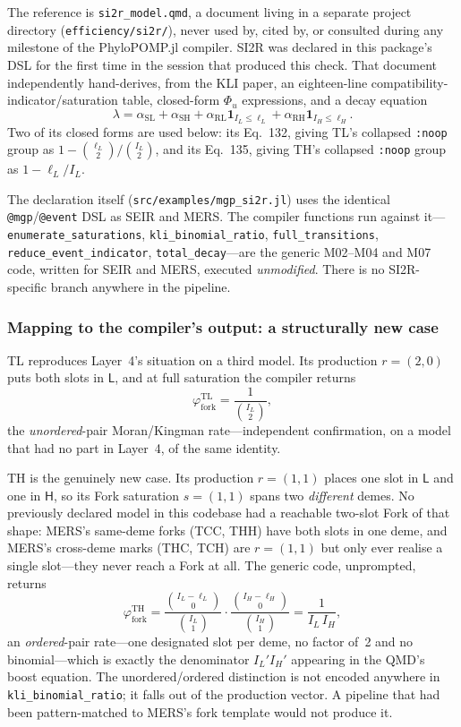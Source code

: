 \documentclass[11pt,leqno]{article}
\newcommand{\indicator}[1]{\mathbf{1}_{#1}}
\newcommand{\pkg}[1]{\textsf{#1}}
\newcommand{\code}[1]{\texttt{#1}}
\newcommand{\deme}[1]{\mathsf{#1}}
\theoremstyle{plain}
\theoremstyle{definition}
\begin{document}
The reference is \code{si2r\_model.qmd}, a document living in a separate
project directory (\code{efficiency/si2r/}), never used by, cited by, or
consulted during any milestone of the \pkg{PhyloPOMP.jl} compiler.  SI2R was
declared in this package's DSL for the first time in the session that
produced this check.  That document independently hand-derives, from the KLI
paper, an eighteen-line compatibility-indicator/saturation table, closed-form
$\Phi_u$ expressions, and a decay equation
\[
  \lambda = \alpha_{\text{SL}} + \alpha_{\text{SH}}
    + \alpha_{\text{RL}} \indicator{I_L \le \ell_L}
    + \alpha_{\text{RH}} \indicator{I_H \le \ell_H}.
\]
Two of its closed forms are used below: its Eq.~132, giving TL's collapsed
\code{:noop} group as $1 - \binom{\ell_L}{2}\big/\binom{I_L}{2}$, and its
Eq.~135, giving TH's collapsed \code{:noop} group as $1 - \ell_L/I_L$.

The declaration itself (\code{src/examples/mgp\_si2r.jl}) uses the identical
\code{@mgp}/\code{@event} DSL as SEIR and MERS.  The compiler functions run
against it---\code{enumerate\_saturations}, \code{kli\_binomial\_ratio},
\code{full\_transitions}, \code{reduce\_event\_indicator},
\code{total\_decay}---are the generic M02--M04 and M07 code, written for
SEIR and MERS, executed \emph{unmodified}.  There is no SI2R-specific branch
anywhere in the pipeline.

\subsubsection{Mapping to the compiler's output: a structurally new case}

TL reproduces Layer~4's situation on a third model.  Its production
$r = (2,0)$ puts both slots in $\deme{L}$, and at full saturation the
compiler returns
\[
  \varphi_{\text{fork}}^{\text{TL}} = \frac{1}{\binom{I_L}{2}},
\]
the \emph{unordered}-pair Moran/Kingman rate---independent confirmation, on a
model that had no part in Layer~4, of the same identity.

TH is the genuinely new case.  Its production $r = (1,1)$ places one slot in
$\deme{L}$ and one in $\deme{H}$, so its Fork saturation $s = (1,1)$ spans
two \emph{different} demes.  No previously declared model in this codebase
had a reachable two-slot Fork of that shape: MERS's same-deme forks
(TCC, THH) have both slots in one deme, and MERS's cross-deme marks
(THC, TCH) are $r = (1,1)$ but only ever realise a single slot---they never
reach a Fork at all.  The generic code, unprompted, returns
\[
  \varphi_{\text{fork}}^{\text{TH}}
  = \frac{\binom{I_L - \ell_L}{0}}{\binom{I_L}{1}}
    \cdot \frac{\binom{I_H - \ell_H}{0}}{\binom{I_H}{1}}
  = \frac{1}{I_L \, I_H},
\]
an \emph{ordered}-pair rate---one designated slot per deme, no factor of~2
and no binomial---which is exactly the denominator $I_L' I_H'$ appearing in
the QMD's boost equation.  The unordered/ordered distinction is not encoded
anywhere in \code{kli\_binomial\_ratio}; it falls out of the production
vector.  A pipeline that had been pattern-matched to MERS's fork template
would not produce it.
\end{document}
